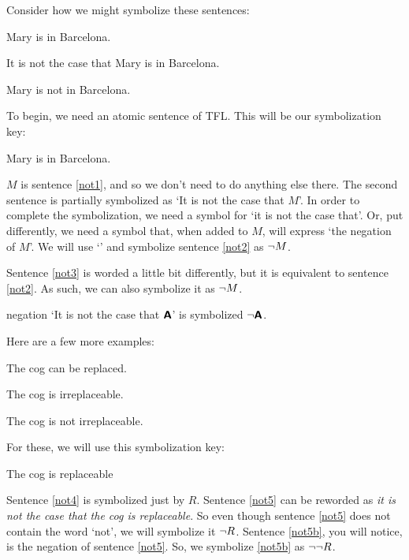 Consider how we might symbolize these sentences:
	\begin{earg}
	\item[\ex{not1}] Mary is in Barcelona.
	\item[\ex{not2}] It is not the case that Mary is in Barcelona.
	\item[\ex{not3}] Mary is not in Barcelona.
	\end{earg}
To begin, we need an atomic sentence of TFL. This will be our symbolization key:
	\begin{ekey}
		\item[M] Mary is in Barcelona.
	\end{ekey}
	
$M$ is sentence \ref{not1}, and so we don't need to do anything else there. 
The second sentence is partially symbolized as `It is not the case that $M$'. In order to complete the symbolization, we need a symbol for `it is not the case that'. Or, put differently, we need a symbol that, when added to $M$, will express `the negation of $M$'. We will use `\enot' and symbolize sentence \ref{not2} as ${\neg} M$.

Sentence \ref{not3} is worded a little bit differently, but it is equivalent to sentence \ref{not2}. As such, we can also symbolize it as ${\neg} M$.

\begin{factboxy}{negation}
`It is not the case that $\bm{\mathsf{A}}$' is symbolized ${\neg}\bm{\mathsf{A}}$.
\end{factboxy}

Here are a few more examples:
	\begin{earg}
		\item[\ex{not4}] The cog can be replaced.
		\item[\ex{not5}] The cog is irreplaceable.
		\item[\ex{not5b}] The cog is not irreplaceable.
	\end{earg}

\filbreak

\noindent For these, we will use this symbolization key:
	\begin{ekey}
		\item[R] The cog is replaceable
	\end{ekey}


\noindent Sentence \ref{not4} is symbolized just by $R$. Sentence \ref{not5} can be reworded as \textit{it is not the case that the cog is replaceable}. So even though sentence \ref{not5} does not contain the word `not', we will symbolize it ${\neg} R$.
Sentence \ref{not5b}, you will notice, is the negation of sentence \ref{not5}. So, we symbolize \ref{not5b} as ${\neg}{\neg} R$.

